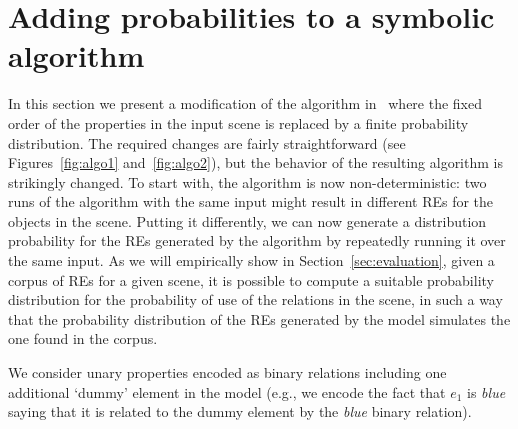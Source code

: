 \section{Adding probabilities to a symbolic algorithm} \label{sec:algorithm}

In this section we present a modification of the algorithm
in~\cite{arec2:2008:Areces} where the fixed order of the properties in
the input scene is replaced by a finite probability distribution.  The
required changes are fairly straightforward (see
Figures~\ref{fig:algo1} and~\ref{fig:algo2}), but the behavior of the
resulting algorithm is strikingly changed. To start with, the
algorithm is now non-deterministic: two runs of the algorithm with the
same input might result in different REs for the objects in the scene.
Putting it differently, we can now generate a distribution probability
for the REs generated by the algorithm by repeatedly running it over
the same input.  As we will empirically show in
Section~\ref{sec:evaluation}, given a corpus of REs for a given scene,
it is possible to compute a suitable probability distribution for the
probability of use of the relations in the scene, in such a way that
the probability distribution of the REs generated by the model
simulates the one found in the corpus.

We consider unary properties encoded as binary relations including one
additional `dummy' element in the model (e.g., we encode the fact that
$e_1$ is \emph{blue} saying that it is related to the dummy element by
the \emph{blue} binary relation).



